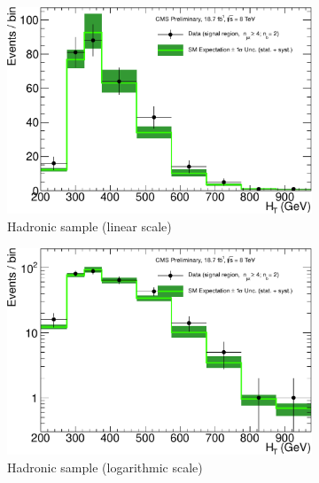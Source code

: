 \clearpage
\begin{figure}[h!]
  \centering
  \begin{subfigure}[b]{0.48\textwidth}
    \includegraphics[width=\textwidth]
    {Figs/results/v0/greenBand/single_plots/hadronic_2b_ge4j.pdf}
    \caption{Hadronic sample (linear scale)}
  \end{subfigure}
  \vspace{0.7cm}\begin{subfigure}[b]{0.48\textwidth}
    \includegraphics[width=\textwidth]
    {Figs/results/v0/greenBand/single_plots/hadronic_2b_ge4j_logy.pdf}
    \caption{Hadronic sample (logarithmic scale)}
  \end{subfigure}
  \begin{subfigure}[b]{0.48\textwidth}

\end{subfigure}
\end{figure}
